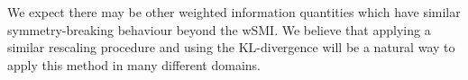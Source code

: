 \documentclass[journal]{IEEEtran}
\theoremstyle{definition}
\begin{document}
We expect there may be other weighted information quantities which have similar symmetry-breaking behaviour beyond the wSMI. We believe that applying a similar rescaling procedure and using the KL-divergence will be a natural way to apply this method in many different domains.



\end{document}
